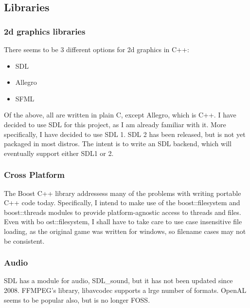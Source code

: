    	\newpage
    
   	\subsection{Libraries}
       	\subsubsection{2d graphics libraries}
    	There seems to be 3 different options for 2d graphics in C++:
    	\begin{itemize}
    	    \item{SDL}
    	    \item{Allegro}
    	    \item{SFML}
    	\end{itemize}
    	
    	Of the above, all are written in plain C, except Allegro, which is C++.
    	I have decided to use SDL for this project, as I am already familiar with it.
    	More specifically, I have decided to use SDL 1.
    	SDL 2 has been released, but is not yet packaged in most distros. 
    	The intent is to write an SDL backend, which will eventually support either SDL1 or 2.
    	
    	\subsubsection{Cross Platform}
        The Boost C++ library addressess many of the problems with writing portable C++ code today.
        Specifically, I intend to make use of the boost::filesystem and boost::threads modules to provide platform-agnostic access to threads and files.
        Even with bo	ost::filesystem, I shall have to take care to use case insensitive file loading, as the original game was written for windows, so filename cases may not be consistent.
        
        \subsubsection{Audio}
        SDL has a module for audio, SDL\_sound\cite{sdls}, but it has not been updated since 2008.
        FFMPEG's library, libavcodec\cite{libavcodec} supports a lrge number of formats.
        OpenAL seems to be popular also, but is no longer FOSS.